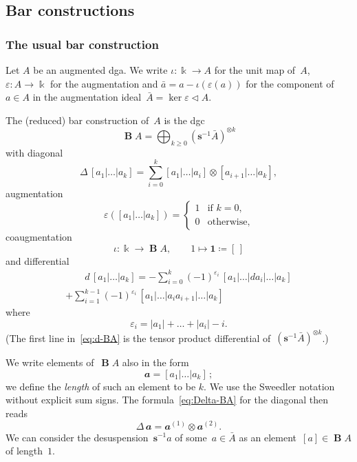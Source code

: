 \documentclass[letterpaper]{amsart}
\numberwithin{equation}{section}
\theoremstyle{plain}
\theoremstyle{definition}
\theoremstyle{remark}
\let\newterm\emph
\let\epsilon\varepsilon
\DeclareMathOperator{\BB}{\mathbf{B}}
\def\kk{\Bbbk}
\def\BBone{\mathbf{1}}
\def\deg#1{|#1|}
\def\susp{\mathbf{s}}
\def\desusp{\susp^{-1}}
\def\aa{\mathbfit{a}}
\def\swee#1#2{#1^{(#2)}}
\begin{document}
\goodbreak
\subsection{Bar constructions}

\subsubsection{The usual bar construction}

Let $A$ be an augmented dga. We write $\iota\colon\kk\to A$ for the unit map of~$A$,
$\epsilon\colon A\to\kk$ for the augmentation
and $\bar a=a-\iota(\epsilon(a))$ for the component of~$a\in A$ in the augmentation ideal~$\bar A=\ker\epsilon\lhd A$.

The (reduced) bar construction of~$A$ is the dgc
\begin{equation}
  \BB A = \bigoplus_{k\ge0} (\desusp \bar A)^{\otimes k}
\end{equation}
with diagonal
\begin{equation}
  \label{eq:Delta-BA}
  \Delta\,[a_{1}|\dots|a_{k}] = \sum_{i=0}^{k} [a_{1}|\dots|a_{i}] \otimes [a_{i+1}|\dots|a_{k}],
\end{equation}
augmentation
\begin{equation}
  \epsilon([a_{1}|\dots|a_{k}]) = \begin{cases}
    1 & \text{if $k=0$,} \\
    0 & \text{otherwise,}
  \end{cases}
\end{equation}
coaugmentation
\begin{equation}
  \iota\colon \kk\to \BB A,
  \qquad
  1 \mapsto \BBone \coloneqq [\,]
\end{equation}
and differential
\begin{multline}
  \label{eq:d-BA}
  \qquad
  d\,[a_{1}|\dots|a_{k}] = - \sum_{i=0}^{k} (-1)^{\epsilon_{i}}\,[a_{1}|\dots|da_{i}|\dots|a_{k}] \\
  + \sum_{i=1}^{k-1} (-1)^{\epsilon_{i}}\,[a_{1}|\dots|a_{i}a_{i+1}|\dots|a_{k}]
  \qquad
\end{multline}
where
\begin{equation}
  \epsilon_{i} = \deg{a_{1}} + \dots + \deg{a_{i}} - i.
\end{equation}
(The first line in~\eqref{eq:d-BA} is the tensor product differential of~$(\desusp\bar A)^{\otimes k}$.)

We write elements of~$\BB A$ also in the form
\begin{equation}
  \aa = [a_{1}|\dots|a_{k}] \,;
\end{equation}
we define the \newterm{length} of such an element to be $k$.
We use the Sweedler notation without explicit sum signs. The formula~\eqref{eq:Delta-BA} for the diagonal then reads
\begin{equation}
  \Delta\,\aa = \swee{\aa}{1} \otimes \swee{\aa}{2}.
\end{equation}
We can consider the desuspension~$\desusp a$ of some~$a\in\bar A$ as an element~$[a]\in \BB A$ of length~$1$.
\end{document}
